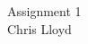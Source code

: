 \documentclass{article}
\begin{document}
\begin{center}
  Assignment 1\\
  Chris Lloyd
\end{center}

\begin{problems}
  \item 
\end{problems}
\end{document}
